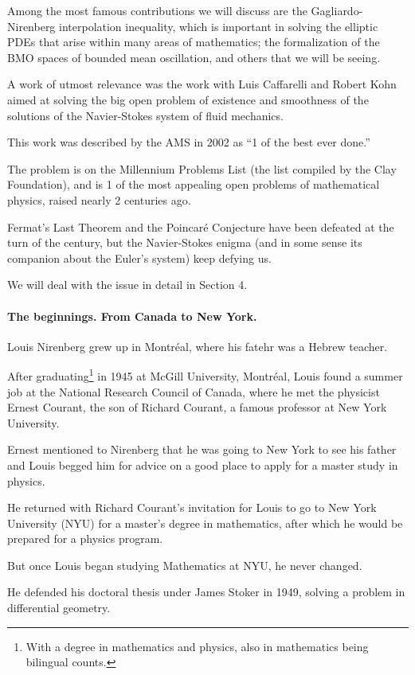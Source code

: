 \documentclass{article}
\begin{document}
Among the most famous contributions we will discuss are the Gagliardo-Nirenberg interpolation inequality, which is important in solving the elliptic PDEs that arise within many areas of mathematics; the formalization of the BMO spaces of bounded mean oscillation, and others that we will be seeing.

%
A work of utmost relevance was the work with Luis Caffarelli and Robert Kohn aimed at solving the big open problem of existence and smoothness of the solutions of the Navier-Stokes system of fluid mechanics.

This work was described by the AMS in 2002 as ``1 of the best ever done.''

The problem is on the Millennium Problems List (the list compiled by the Clay Foundation), and is 1 of the most appealing open problems of mathematical physics, raised nearly 2 centuries ago.

Fermat's Last Theorem and the Poincar\'e Conjecture have been defeated at the turn of the century, but the Navier-Stokes enigma (and in some sense its companion about the Euler's system) keep defying us.

We will deal with the issue in detail in Section 4.

\paragraph{The beginnings. From Canada to New York.} Louis Nirenberg grew up in Montr\'eal, where his fatehr was a Hebrew teacher.

After graduating\footnote{With a degree in mathematics and physics, also in mathematics being bilingual counts.} in 1945 at McGill University, Montréal, Louis found a summer job at the National Research Council of Canada, where he met the physicist Ernest Courant, the son of Richard Courant, a famous professor at New York University.

Ernest mentioned to Nirenberg that he was going to New York to see his father and Louis begged him for advice on a good place to apply for a master study in physics.

He returned with Richard Courant's invitation for Louis to go to New York University (NYU) for a master's degree in mathematics, after which he would be prepared for a physics program.

%
But once Louis began studying Mathematics at NYU, he never changed.

He defended his doctoral thesis under James Stoker in 1949, solving a problem in differential geometry.
\end{document}
